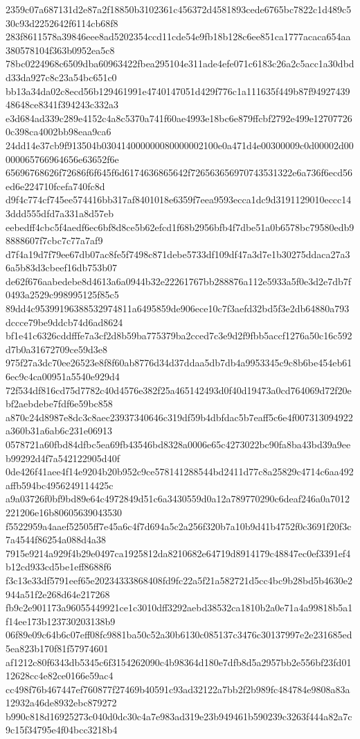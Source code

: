 {2359c07a687131d2e87a2f18850b3102361c456372d4581893cede6765bc7822c1d489c530c93d2252642f6114cb68f8
283f8611578a39846eee8ad5202354ccd11cde54e9fb18b128c6ee851ca1777acaca654aa380578104f363b0952ea5c8
78bc0224968c6509dba60963422fbea295104e311ade4efe071c6183c26a2c5acc1a30dbdd33da927c8c23a54bc651c0
bb13a34da02c8ecd56b129461991e4740147051d429f776c1a111635f449b87f9492743948648ce8341f394243c332a3
e3d684ad339c289e4152c4a8c5370a741f60ae4993e18bc6e879ffcbf2792e499e127077260c398ca4002bb98eaa9ca6
24dd14e37cb9f913504b030414000000080000002100e0a471d4e00300009c0d00002d00000065766964656e63652f6e
65696768626f72686f6f645f6d6174636865642f726563656970743531322e6a736f6ecd56ed6e224710fcefa740fc8d
d9f4c774cf745ee574416bb317af8401018e6359f7eea9593ecca1dc9d3191129010eccc143ddd555dfd7a331a8d57eb
eebedff4cbc5f4aedf6ec6bf8d8ce5b62efcd1f68b2956bfb4f7dbe51a0b6578bc79580edb98888607f7cbc7c77a7af9
d7f4a19d7f79ee67db07ac8fe5f7498c871debe5733df109df47a3d7e1b30275ddaca27a36a5b83d3cbeef16db753b07
de62f676aabedebe8d4613a6a0944b32e22261767bb288876a112e5933a5f0e3d2e7db7f0493a2529c998995125f85c5
89dd4c95399196388532974811a6495859de906ece10c7f3aefd32bd5f3e2db64880a793dccce79be9ddcb74d6ad8624
bf1e41c6326cddfffe7a3cf2d8b59ba775379ba2cced7c3e9d2f9fbb5accf1276a50c16c592d7b0a31672709ce59d3e8
975f27a3dc70ee26523e8f8f60ab8776d34d37ddaa5db7db4a9953345c9c8b6be454eb616ec9c4ca00951a5540e929d4
72f534df816cd75d7782c40d4576e382f25a465142493d0f40d19473a0cd764069d72f20ebf2aebdebe7fdf6e59bc858
a870c24d8987e8dc3c8aec23937340646c319df59b4dbfdac5b7eaff5c6e4f007313094922a360b31a6ab6c231e06913
0578721a60fbd84dfbc5ea69fb43546bd8328a0006e65c4273022bc90fa8ba43bd39a9eeb99292d4f7a542122905d40f
0de426f41aee4f14e9204b20b952c9ce578141288544bd2411d77c8a25829c4714c6aa492affb594bc4956249114425c
a9a03726f0bf9bd89e64c4972849d51c6a3430559d0a12a789770290c6deaf246a0a7012221206e16b80605639043530
f5522959a4aaef52505ff7e45a6c4f7d694a5c2a256f320b7a10b9d41b4752f0c3691f20f3c7a4544f86254a088d4a38
7915e9214a929f4b29e0497ca1925812da8210682e64719d8914179c48847ec0ef3391ef4b12cd933cd5be1eff8688f6
f3c13e33df5791eef65e20234333868408fd9fc22a5f21a582721d5cc4bc9b28bd5b4630e2944a51f2e268d64e217268
fb9c2e901173a96055449921ce1c3010dff3292aebd38532ca1810b2a0e71a4a99818b5a1f14ee173b123730203138b9
06f89e09c64b6c07eff08fc9881ba50c52a30b6130c085137c3476c30137997e2e231685ed5ea823b170f81f57974601
af1212c80f6343db5345c6f3154262090c4b98364d180e7dfb8d5a2957bb2e556bf23fd0112628cc4e82ce0166e59ac4
cc498f76b467447ef760877f27469b40591c93ad32122a7bb2f2b989fc484784e9808a83a12932a46de8932ebc879272
b990c818d16925273c040d0dc30c4a7e983ad319e23b949461b590239c3263f444a82a7c9c15f34795e4f04bcc3218b4
}
